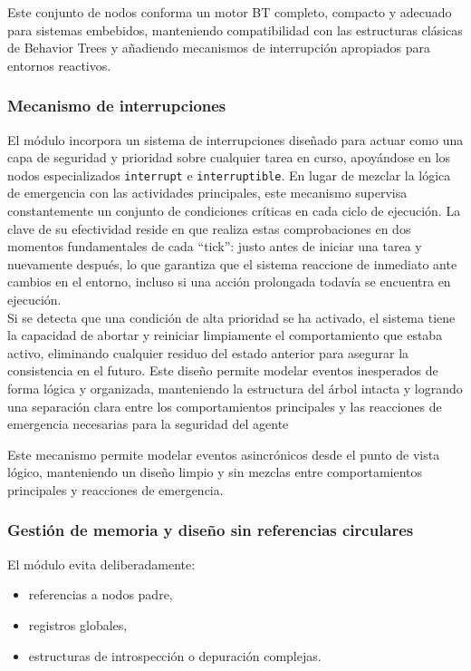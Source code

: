 \documentclass{prgrado}
\begin{document}
Este conjunto de nodos conforma un motor BT completo, compacto y adecuado para sistemas embebidos, manteniendo compatibilidad con las estructuras clásicas de Behavior Trees y añadiendo mecanismos de interrupción apropiados para entornos reactivos.


\subsubsection{Mecanismo de interrupciones}

El módulo incorpora un sistema de interrupciones diseñado para actuar como una capa de seguridad y prioridad sobre cualquier tarea en curso, apoyándose en los nodos especializados  \texttt{interrupt} e  \texttt{interruptible}. En lugar de mezclar la lógica de emergencia con las actividades principales, este mecanismo supervisa constantemente un conjunto de condiciones críticas en cada ciclo de ejecución. La clave de su efectividad reside en que realiza estas comprobaciones en dos momentos fundamentales de cada ``tick'': justo antes de iniciar una tarea y nuevamente después, lo que garantiza que el sistema reaccione de inmediato ante cambios en el entorno, incluso si una acción prolongada todavía se encuentra en ejecución. \\
Si se detecta que una condición de alta prioridad se ha activado, el sistema tiene la capacidad de abortar y reiniciar limpiamente el comportamiento que estaba activo, eliminando cualquier residuo del estado anterior para asegurar la consistencia en el futuro. Este diseño permite modelar eventos inesperados de forma lógica y organizada, manteniendo la estructura del árbol intacta y logrando una separación clara entre los comportamientos principales y las reacciones de emergencia necesarias para la seguridad del agente

Este mecanismo permite modelar eventos asincrónicos desde el punto de vista lógico, manteniendo un diseño limpio y sin mezclas entre comportamientos principales y reacciones de emergencia.

\subsubsection{Gestión de memoria y diseño sin referencias circulares}

El módulo evita deliberadamente:

\begin{itemize}
    \item referencias a nodos padre,
    \item registros globales,
    \item estructuras de introspección o depuración complejas.
\end{itemize}
\end{document}
